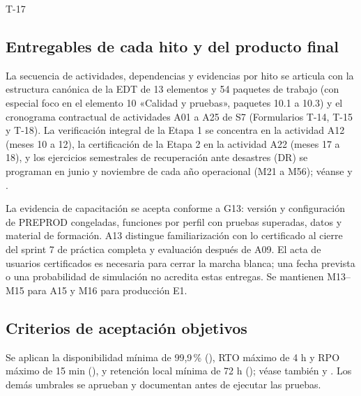 \ifdefined\FormularioActual
\makeatletter
\audit@iniciarpartes
\renewcommand\@pnumwidth{2.2em}
\makeatother
{\renewcommand\textoEncabezado{\color{audit-marino}Índice}\indiceDetallado}
\clearpage
\makeatletter
{}
\makeatother
{}
{}
\fi
\begin{formulario}{T-17}
\subsection*{Entregables de cada hito y del producto final}

La secuencia de actividades, dependencias y evidencias por hito se articula con la estructura canónica de la EDT de 13 elementos y 54 paquetes de trabajo (con especial foco en el elemento 10 «Calidad y pruebas», paquetes 10.1 a 10.3) y el cronograma contractual de actividades A01 a A25 de S7 (Formularios T-14, T-15 y T-18). La verificación integral de la Etapa 1 se concentra en la actividad A12 (meses 10 a 12), la certificación de la Etapa 2 en la actividad A22 (meses 17 a 18), y los ejercicios semestrales de recuperación ante desastres (DR) se programan en junio y noviembre de cada año operacional (M21 a M56); véanse  y .

La evidencia de capacitación se acepta conforme a G13: versión y configuración de PREPROD congeladas, funciones por perfil con pruebas superadas, datos y material de formación. A13 distingue familiarización con lo certificado al cierre del sprint 7 de práctica completa y evaluación después de A09. El acta de usuarios certificados es necesaria para cerrar la marcha blanca; una fecha prevista o una probabilidad de simulación no acredita estas entregas. Se mantienen M13--M15 para A15 y M16 para producción E1.

\subsection*{Criterios de aceptación objetivos}

Se aplican la disponibilidad mínima de 99,9\,\% (), RTO máximo de 4 h y RPO máximo de 15 min (), y retención local mínima de 72 h (); véase también  y . Los demás umbrales se aprueban y documentan antes de ejecutar las pruebas.


\end{formulario}
